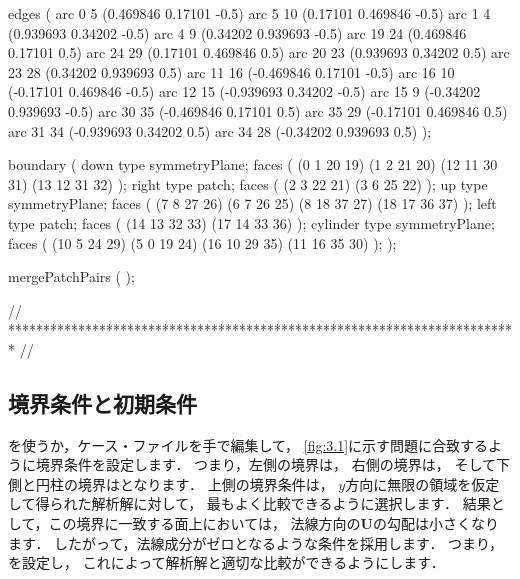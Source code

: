 \begin{OFverbatim}
edges           
(
    arc 0 5 (0.469846 0.17101 -0.5)
    arc 5 10 (0.17101 0.469846 -0.5)
    arc 1 4 (0.939693 0.34202 -0.5)
    arc 4 9 (0.34202 0.939693 -0.5)
    arc 19 24 (0.469846 0.17101 0.5)
    arc 24 29 (0.17101 0.469846 0.5)
    arc 20 23 (0.939693 0.34202 0.5)
    arc 23 28 (0.34202 0.939693 0.5)
    arc 11 16 (-0.469846 0.17101 -0.5)
    arc 16 10 (-0.17101 0.469846 -0.5)
    arc 12 15 (-0.939693 0.34202 -0.5)
    arc 15 9 (-0.34202 0.939693 -0.5)
    arc 30 35 (-0.469846 0.17101 0.5)
    arc 35 29 (-0.17101 0.469846 0.5)
    arc 31 34 (-0.939693 0.34202 0.5)
    arc 34 28 (-0.34202 0.939693 0.5)
);

boundary
(
    down
    {
        type symmetryPlane;
        faces
        (
            (0 1 20 19)
            (1 2 21 20)
            (12 11 30 31)
            (13 12 31 32)
        );
    }
    right
    {
        type patch;
        faces
        (
            (2 3 22 21)
            (3 6 25 22)
        );
    }
    up
    {
        type symmetryPlane;
        faces
        (
            (7 8 27 26)
            (6 7 26 25)
            (8 18 37 27)
            (18 17 36 37)
        );
    }
    left
    {
        type patch;
        faces
        (
            (14 13 32 33)
            (17 14 33 36)
        );
    }
    cylinder
    {
        type symmetryPlane;
        faces
        (
            (10 5 24 29)
            (5 0 19 24)
            (16 10 29 35)
            (11 16 35 30)
        );
    }
);

mergePatchPairs
(
);

// ************************************************************************* //
\end{OFverbatim}

\subsection{境界条件と初期条件}
\label{ssec:3.1.4}
を使うか，ケース・ファイルを手で編集して，
\autoref{fig:3.1}に示す問題に合致するように境界条件を設定します．
つまり，左側の境界は，
右側の境界は，
そして下側と円柱の境界はとなります．
上側の境界条件は，
$y$方向に無限の領域を仮定して得られた解析解に対して，
最もよく比較できるように選択します．
結果として，この境界に一致する面上においては，
法線方向の$\bm{U}$の勾配は小さくなります．
したがって，法線成分がゼロとなるような条件を採用します．
つまり，を設定し，
これによって解析解と適切な比較ができるようにします．


